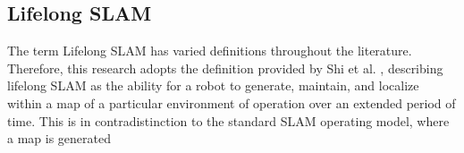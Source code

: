 \subsection{Lifelong SLAM}

The term Lifelong SLAM has varied definitions throughout the literature. Therefore, this research adopts the definition provided by Shi et al. \cite{shiAreWeReady2020}, describing lifelong SLAM as the ability for a robot to generate, maintain, and localize within a map of a particular environment of operation over an extended period of time. This is in contradistinction to the standard SLAM operating model, where a map is generated 